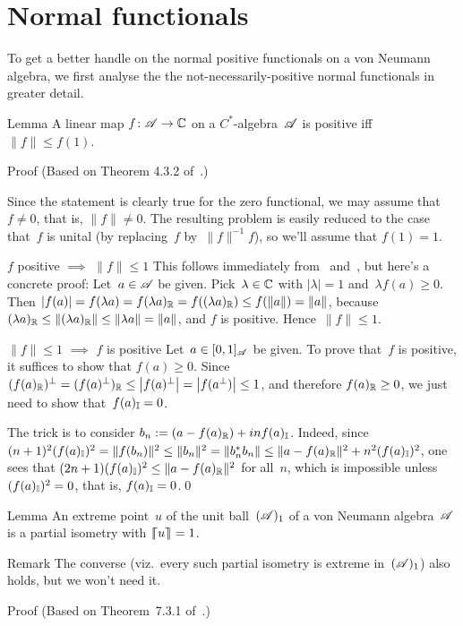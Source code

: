 \documentclass[a]{subfiles}
\begin{document}
\section{Normal functionals}
\begin{parsec}%
\begin{point}%
To get a better handle on the normal positive functionals
on a von Neumann algebra,
we first analyse the the not-necessarily-positive normal functionals
in greater detail.
\end{point}
\begin{point}{Lemma}%
A linear map $f\colon \mathscr{A}\to \mathbb{C}$
on a $C^*$-algebra~$\mathscr{A}$
is positive iff $\|f\|\leq f(1)$.
\begin{point}{Proof}%
(Based on Theorem 4.3.2 of~\cite{kr}.)

Since the statement is clearly true for the zero functional,
we may assume that~$f\neq 0$, that is, $\|f\|\neq 0$.
The resulting
problem is  easily reduced
to the case that~$f$ is unital
(by replacing~$f$ by~$\|f\|^{-1}f $), so we'll assume that $f(1)=1$.

\begin{point}{$f$ positive $\implies$ $\|f\|\leq 1$}%
This follows
immediately from~ and~,
but here's a concrete proof:
Let~$a\in \mathscr{A}$ be given.
Pick~$\lambda\in \mathbb{C}$ with $\left|\lambda\right|=1$
and~$\lambda f(a)\geq 0$.
Then $\left|f(a)\right|=f(\lambda a) 
= f(\lambda a)_{\mathbb{R}}
= f((\lambda a)_{\mathbb{R}})
\leq f(\|a\|)=\|a\|$,
because $(\lambda a)_{\mathbb{R}}
\leq \|(\lambda a)_{\mathbb{R}}\|
\leq \|\lambda a\|=\|a\|$,
and $f$ is positive.
Hence~$\|f\|\leq 1$.
\end{point}
\begin{point}{$\|f\|\leq 1$ $\implies$ $f$ is positive}%
Let~$a\in [0,1]_{\mathscr{A}}$ be given.
To prove that~$f$ is positive, it suffices to show that $f(a)\geq 0$.
Since $(f(a)_{\mathbb{R}})^\perp
=(f(a)^\perp)_{\mathbb{R}}
\leq \left|f(a)^\perp \right|
=\left|f(a^\perp)\right|\leq 1$,
and therefore $f(a)_{\mathbb{R}}\geq 0$,
we just need to show that~$f(a)_{\mathbb{I}}=0$.

The trick is to consider $b_n := (a - f(a)_{\mathbb{R}})+inf(a)_{\mathbb{I}}$.
Indeed, since $(n+1)^2(f(a)_{\mathbb{I}})^2
= \|f(b_n)\|^2 \leq \|b_n\|^2 = 
\|b_n^*b_n\| \leq \|a-f(a)_{\mathbb{R}}\|^2 + n^2(f(a)_{\mathbb{I}})^2$,
one sees that $(2n+1)(f(a)_{\mathbb{I}})^2\leq \|a-f(a)_{\mathbb{R}}\|^2$
for all~$n$,
which is impossible unless~$(f(a)_{\mathbb{I}})^2=0$,
that is, $f(a)_{\mathbb{I}}=0$.\qed
\end{point}
\end{point}
\end{point}
\begin{point}{Lemma}%
An extreme point~$u$ of the unit ball~$(\mathscr{A})_1$
of a von Neumann algebra~$\mathscr{A}$
is a partial isometry with $\left\lceil\!\!\left\lceil u\right\rceil\!\!\right\rceil=1$.
\begin{point}{Remark}%
The converse (viz.~every such partial isometry
is extreme in~$(\mathscr{A})_1$)
also holds, but we won't need it.
\end{point}
\begin{point}{Proof}%
(Based on Theorem~7.3.1 of~\cite{kr}.)


\end{point}
\end{point}
\end{parsec}
\end{document}
